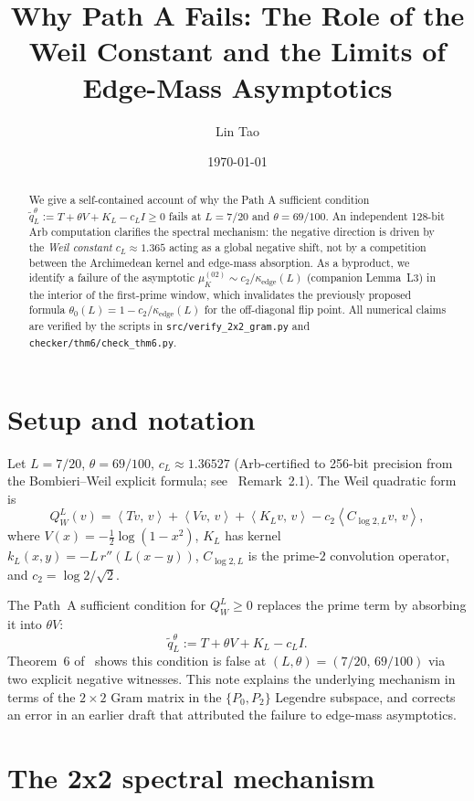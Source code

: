 \documentclass[12pt,a4paper]{amsart}
\title{Why Path A Fails: The Role of the Weil Constant
  and the Limits of Edge-Mass Asymptotics}
\author{Lin Tao}
\date{\today}
\theoremstyle{plain}
\theoremstyle{definition}
\newcommand{\ctwo}{c_2}
\newcommand{\kappae}{\kappa_{\mathrm{edge}}}
\newcommand{\ip}[2]{\left\langle #1,\,#2\right\rangle}
\begin{document}
\maketitle

\begin{abstract}
We give a self-contained account of why the Path A sufficient condition
$\tilde{q}_L^\theta := T + \theta V + K_L - c_L I \ge 0$ fails at $L = 7/20$
and $\theta = 69/100$.
An independent 128-bit Arb computation clarifies the spectral mechanism:
the negative direction is driven by the \emph{Weil constant}
$c_L \approx 1.365$ acting as a global negative shift, not by a
competition between the Archimedean kernel and edge-mass absorption.
As a byproduct, we identify a failure of the asymptotic
$\mu_K^{(02)} \sim \ctwo/\kappae(L)$ (companion Lemma~L3) in the interior
of the first-prime window, which invalidates the previously proposed
formula $\theta_0(L) = 1 - \ctwo/\kappae(L)$ for the off-diagonal
flip point.
All numerical claims are verified by the scripts in
\texttt{src/verify\_2x2\_gram.py} and \texttt{checker/thm6/check\_thm6.py}.
\end{abstract}

\section{Setup and notation}

Let $L = 7/20$, $\theta = 69/100$, $c_L \approx 1.36527$ (Arb-certified to
256-bit precision from the Bombieri--Weil explicit formula;
see~\cite{WFP2026} Remark~2.1).
The Weil quadratic form is
\[
  Q_W^L(v)
  = \ip{Tv}{v} + \ip{Vv}{v} + \ip{K_Lv}{v}
    - \ctwo\ip{C_{\log2,L}v}{v},
\]
where $V(x) = -\tfrac12\log(1-x^2)$, $K_L$ has kernel
$k_L(x,y) = -L\,r''(L(x-y))$, $C_{\log2,L}$ is the prime-$2$
convolution operator, and $\ctwo = \log2/\sqrt2$.

The Path~A sufficient condition for $Q_W^L \ge 0$ replaces the prime term
by absorbing it into $\theta V$:
\[
  \tilde{q}_L^\theta := T + \theta V + K_L - c_L I.
\]
Theorem~6 of~\cite{WFP2026} shows this condition is false at
$(L,\theta) = (7/20,\,69/100)$ via two explicit negative witnesses.
This note explains the underlying mechanism in terms of the $2\times2$
Gram matrix in the $\{P_0, P_2\}$ Legendre subspace, and corrects an
error in an earlier draft that attributed the failure to edge-mass
asymptotics.

\section{The 2x2 spectral mechanism}
\end{document}
